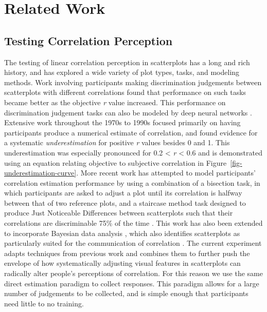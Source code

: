 \documentclass[manuscript, review, anonymous, screen]{acmart}
\begin{document}
\hypertarget{sec-related-work}{%
\section{Related Work}\label{sec-related-work}}

\hypertarget{sec-testing-corr-percept}{%
\subsection{Testing Correlation
Perception}\label{sec-testing-corr-percept}}

The testing of linear correlation perception in scatterplots has a long
and rich history, and has explored a wide variety of plot types, tasks,
and modeling methods. Work involving participants making discrimination
judgements between scatterplots with different correlations
\citep{pollack_1960, doherty_2007} found that performance on such tasks
became better as the objective \emph{r} value increased. This
performance on discrimination judgement tasks can also be modeled by
deep neural networks \citep{yang_2023}. Extensive work throughout the
1970s to 1990s focused primarily on having participants produce a
numerical estimate of correlation, and found evidence for a systematic
\emph{underestimation} for positive \emph{r} values besides 0 and 1.
This underestimation was especially pronounced for 0.2 \textless{}
\emph{r} \textless{} 0.6
\citep{strahan_1978, bobko_1979, cleveland_1982, lane_1985, lauer_1989, collyer_1990, meyer_1992}
and is demonstrated using an equation relating objective to subjective
correlation \citep{rensink_2017} in
Figure~\ref{fig-underestimation-curve}. More recent work has attempted
to model participants' correlation estimation performance by using a
combination of a bisection task, in which participants are asked to
adjust a plot until its correlation is halfway between that of two
reference plots, and a staircase method task designed to produce Just
Noticeable Differences between scatterplots such that their correlations
are discriminable 75\% of the time \citep{rensink_2010}. This work has
also been extended to incorporate Bayesian data analysis
\citep{kay_2015}, which also identifies scatterplots as particularly
suited for the communication of correlation
\citep{li_2010, harrison_2014}. The current experiment adapts techniques
from previous work \citep{strain_2023, strain_2023b} and combines them
to further push the envelope of how systematically adjusting visual
features in scatterplots can radically alter people's perceptions of
correlation. For this reason we use the same direct estimation paradigm
to collect responses. This paradigm allows for a large number of
judgements to be collected, and is simple enough that participants need
little to no training.
\end{document}
